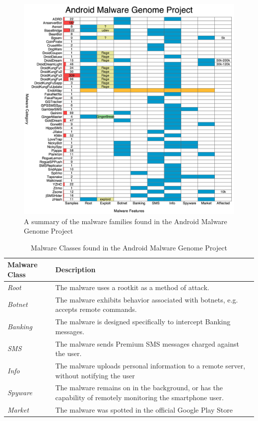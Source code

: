 \begin{figure}[h]
\begin{center}
\includegraphics[width=0.85\columnwidth]{figs/NCSUMalwareDataset}
\caption{A summary of the malware families found in the Android Malware Genome Project}
\label{fig:malwaredboverview}
\end{center}
\end{figure}

\begin{table}[h]
\begin{small}
\begin{tabular}{p{3cm}|p{12.5cm}}
Malware Class & Description \\
\hline

\textit{Root} & The malware uses a rootkit as a method of attack.    \\
\textit{Botnet} & The malware exhibits behavior associated with botnets, e.g. accepts remote commands.    \\
\textit{Banking} & The malware is designed specifically to intercept Banking messages.    \\
\textit{SMS} & The malware sends Premium SMS messages charged against the user.    \\
\textit{Info} &  The malware uploads personal information to a remote server, without notifying the user   \\
\textit{Spyware} & The malware remains on in the background, or has the capability of remotely monitoring the smartphone user.    \\
\textit{Market} &  The malware was spotted in the official Google Play Store   \\

\end{tabular}
\end{small}
\caption{Malware Classes found in the Android Malware Genome Project}
\label{tab:malwaredbcategories}
\end{table}


